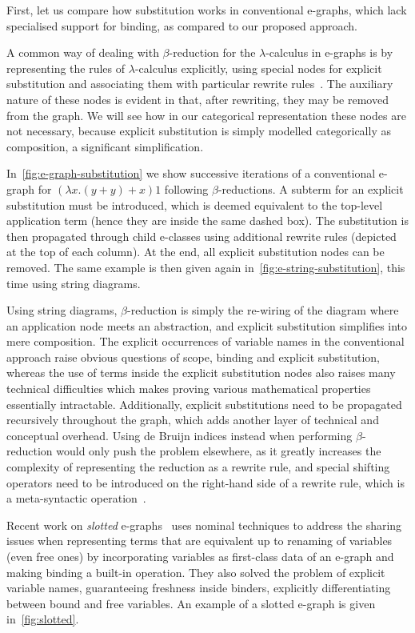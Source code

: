 First, let us compare how substitution works in conventional e-graphs, which lack specialised support for binding, as compared to our proposed approach.

A common way of dealing with $\beta$-reduction for the $\lambda$-calculus in e-graphs is by representing the rules of $\lambda$-calculus explicitly, using special nodes for explicit substitution and associating them with particular rewrite rules~\cite{EggPaper,koehler2022sketchguided}.
The auxiliary nature of these nodes is evident in that, after rewriting, they may be removed from the graph.
We will see how in our categorical representation these nodes are not necessary, because explicit substitution is simply modelled categorically as composition, a significant simplification.

In~\autoref{fig:e-graph-substitution} we show successive iterations of a conventional e-graph for $(\lambda x . (y + y) + x) 1$ following $\beta$-reductions.
A subterm for an explicit substitution must be introduced, which is deemed equivalent to the top-level application term (hence they are inside the same dashed box).
The substitution is then propagated through child e-classes using additional rewrite rules (depicted at the top of each column).
At the end, all explicit substitution nodes can be removed.
The same example is then given again in~\autoref{fig:e-string-substitution}, this time using string diagrams.

Using string diagrams, $\beta$-reduction is simply the re-wiring of the diagram where an application node meets an abstraction, and explicit substitution simplifies into mere composition.
The explicit occurrences of variable names in the conventional approach raise obvious questions of scope, binding and explicit substitution, whereas the use of terms inside the explicit substitution nodes also raises many technical difficulties which makes proving various mathematical properties essentially intractable.
Additionally, explicit substitutions need to be propagated recursively throughout the graph, which adds another layer of technical and conceptual overhead.
Using de Bruijn indices instead when performing $\beta$-reduction would only push the problem elsewhere, as it greatly increases the complexity of representing the reduction as a rewrite rule, and special shifting operators need to be introduced on the right-hand side of a rewrite rule, which is a meta-syntactic operation~\cite{koehler2022sketchguided}.

Recent work on \emph{slotted} e-graphs~\cite{slotted-egraphs} uses nominal techniques to address the sharing issues when representing terms that are equivalent up to renaming of variables (even free ones) by incorporating variables as first-class data of an e-graph and making binding a built-in operation.
They also solved the problem of explicit variable names, guaranteeing freshness inside binders, explicitly differentiating between bound and free variables.
An example of a slotted e-graph is given in~\autoref{fig:slotted}.

